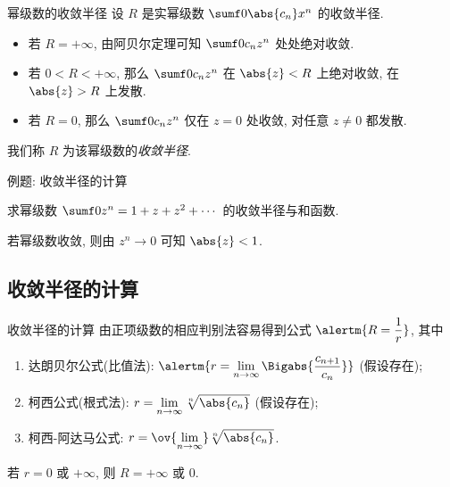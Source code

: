 \begin{frame}{幂级数的收敛半径}
	\onslide<+->
	设 $R$ 是实幂级数 $\sumf0\abs{c_n}x^n$ 的收敛半径.
	\begin{itemize}
		\item 若 $R=+\infty$, 由阿贝尔定理可知 $\sumf0 c_nz^n$ 处处绝对收敛.
		\item 若 $0<R<+\infty$, 那么 $\sumf0 c_nz^n$ 在 $\abs{z}<R$ 上绝对收敛, 在 $\abs{z}>R$ 上发散.
		\item 若 $R=0$, 那么 $\sumf0 c_nz^n$ 仅在 $z=0$ 处收敛, 对任意 $z\neq 0$ 都发散.
	\end{itemize}
	\onslide<+->
	我们称 $R$ 为该幂级数的\emph{收敛半径}.
	\onslide<+->
	\begin{center}
	\end{center}
\end{frame}


\begin{frame}{例题: 收敛半径的计算}
	\onslide<+->
	\begin{example}[nearnext]
		求幂级数 $\sumf0 z^n=1+z+z^2+\cdots$ 的收敛半径与和函数.
	\end{example}
	\onslide<+->
	\begin{solution}[nearprev]
		若幂级数收敛, 则由 $z^n\to0$ 可知 $\abs{z}<1$.
		\onslide<+->{因此收敛半径为 $1$.}
	\end{solution}
\end{frame}


\subsection{收敛半径的计算}
\begin{frame}{收敛半径的计算}
	\onslide<+->
	由正项级数的相应判别法容易得到公式 $\alertm{R=\dfrac1r}$, 其中
	\begin{enumerate}
		\item \alert{达朗贝尔公式(比值法)}: $\alertm{r=\displaystyle\lim_{n\to\infty}\Bigabs{\frac{c_{n+1}}{c_n}}}$ (假设存在);
		\item 柯西公式(根式法): $r=\displaystyle\lim_{n\to\infty}\sqrt[n]{\abs{c_n}}$ (假设存在);
		\item 柯西-阿达马公式: $r=\displaystyle\ov{\lim_{n\to\infty}} \sqrt[n]{\abs{c_n}}$.
	\end{enumerate}
	\onslide<+->
	若 $r=0$ 或 $+\infty$, 则 $R=+\infty$ 或 $0$.
\end{frame}


